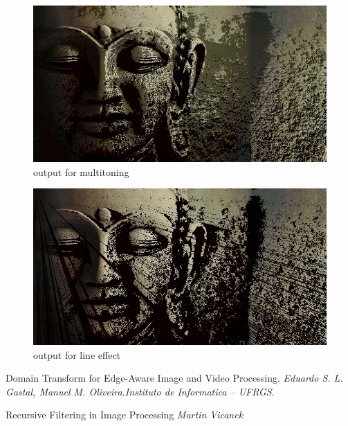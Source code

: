 \documentclass[conference]{IEEEtran}
\begin{document}
   \begin{figure}
 	\includegraphics[width = \linewidth]{buddha_out_2sources.jpg}
 	\caption{output for multitoning}
 	\label{fig:outputMulti}
 \end{figure}
 
  \begin{figure}[t]
 	\includegraphics[width = \linewidth]{buddha_out_lines.jpg}
 	\caption{output for line effect}
 	\label{fig:outputLines}
 \end{figure} 

\begin{thebibliography}{9}
Domain Transform for Edge-Aware Image and Video Processing.
\textit{Eduardo S. L. Gastal, Manuel M. Oliveira.Instituto de Informatica – UFRGS}. 
 
Recursive Filtering in Image Processing 
\textit{Martin Vicanek}
 
\end{thebibliography}
\end{document}
